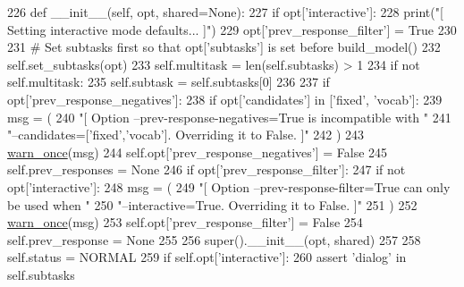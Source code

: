 \begin{DoxyCode}
226     \textcolor{keyword}{def }\_\_init\_\_(self, opt, shared=None):
227         \textcolor{keywordflow}{if} opt[\textcolor{stringliteral}{'interactive'}]:
228             print(\textcolor{stringliteral}{"[ Setting interactive mode defaults... ]"})
229             opt[\textcolor{stringliteral}{'prev\_response\_filter'}] = \textcolor{keyword}{True}
230 
231         \textcolor{comment}{# Set subtasks first so that opt['subtasks'] is set before build\_model()}
232         self.set\_subtasks(opt)
233         self.multitask = len(self.subtasks) > 1
234         \textcolor{keywordflow}{if} \textcolor{keywordflow}{not} self.multitask:
235             self.subtask = self.subtasks[0]
236 
237         \textcolor{keywordflow}{if} opt[\textcolor{stringliteral}{'prev\_response\_negatives'}]:
238             \textcolor{keywordflow}{if} opt[\textcolor{stringliteral}{'candidates'}] \textcolor{keywordflow}{in} [\textcolor{stringliteral}{'fixed'}, \textcolor{stringliteral}{'vocab'}]:
239                 msg = (
240                     \textcolor{stringliteral}{"[ Option --prev-response-negatives=True is incompatible with "}
241                     \textcolor{stringliteral}{"--candidates=['fixed','vocab']. Overriding it to False. ]"}
242                 )
243                 \hyperlink{namespaceparlai_1_1utils_1_1misc_a884a3aefa90581f53bc592fa6a78dc43}{warn\_once}(msg)
244                 self.opt[\textcolor{stringliteral}{'prev\_response\_negatives'}] = \textcolor{keyword}{False}
245             self.prev\_responses = \textcolor{keywordtype}{None}
246         \textcolor{keywordflow}{if} opt[\textcolor{stringliteral}{'prev\_response\_filter'}]:
247             \textcolor{keywordflow}{if} \textcolor{keywordflow}{not} opt[\textcolor{stringliteral}{'interactive'}]:
248                 msg = (
249                     \textcolor{stringliteral}{"[ Option --prev-response-filter=True can only be used when "}
250                     \textcolor{stringliteral}{"--interactive=True. Overriding it to False. ]"}
251                 )
252                 \hyperlink{namespaceparlai_1_1utils_1_1misc_a884a3aefa90581f53bc592fa6a78dc43}{warn\_once}(msg)
253                 self.opt[\textcolor{stringliteral}{'prev\_response\_filter'}] = \textcolor{keyword}{False}
254             self.prev\_response = \textcolor{keywordtype}{None}
255 
256         super().\_\_init\_\_(opt, shared)
257 
258         self.status = NORMAL
259         \textcolor{keywordflow}{if} self.opt[\textcolor{stringliteral}{'interactive'}]:
260             \textcolor{keyword}{assert} \textcolor{stringliteral}{'dialog'} \textcolor{keywordflow}{in} self.subtasks

\end{DoxyCode}
